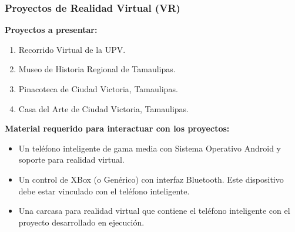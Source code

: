 \documentclass[aspectratio=169,compress]{beamer}
\begin{document}




\begin{frame}
\frametitle{Proyectos de Realidad Virtual (VR)}
\textbf{Proyectos a presentar:}
\begin{enumerate}
\item Recorrido Virtual de la UPV.
\item Museo de Historia Regional de Tamaulipas.
\item Pinacoteca de Ciudad Victoria, Tamaulipas.
\item Casa del Arte de Ciudad Victoria, Tamaulipas.
\end{enumerate}
\textbf{Material requerido para interactuar con los proyectos:}
\begin{itemize}
\item Un teléfono inteligente de gama media con Sistema Operativo Android y soporte para realidad virtual.
\item Un control de XBox (o Genérico) con interfaz Bluetooth\tm. Este dispositivo debe estar vinculado con el teléfono inteligente. 
\item Una carcasa para realidad virtual que contiene el teléfono inteligente con el proyecto desarrollado en ejecución. 
\end{itemize}
\end{frame}
\end{document}

